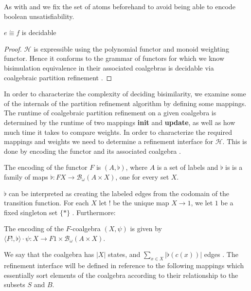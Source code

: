 \documentclass[a4paper,UKenglish,cleveref, autoref, thm-restate]{lipics-v2021}
\newcommand{\gkat}{\textsf{\upshape{GKAT}}\xspace}
\newcommand{\probgkat}{\textsf{\upshape{ProbGKAT}}\xspace}
\theoremstyle{plain}\newtheoremrep{thm}{Theorem}[section]
\begin{document}
	\begin{toappendix} 
		\label{DecideAppendix}
		As with \gkat and \probgkat we fix the set of atoms beforehand to avoid being able to encode boolean unsatisfiability.
	\begin{thm}[Decidability]
		$e\dot\equiv f$ is decidable
	\end{thm}
	\begin{proof}
		$\mathcal H$ is expressible using the polynomial functor and monoid weighting functor. Hence it conforms to the grammar of functors for which we know bisimulation equivalence in their associated coalgebras is decidable via coalgebraic partition refinement \cite{10.1007/978-3-030-30942-8_18}. 
	\end{proof}

		In order to characterize the complexity of deciding bisimilarity, we examine some of the internals of the partition refinement algorithm by defining some mappings. The runtime of coalgebraic partition refinement on a given coalgebra is determined by the runtime of two mappings \textbf{init} and \textbf{update}, as well as how much time it takes to compare weights. In order to characterize the required mappings and weights we need to determine a refinement interface for $\mathcal{H}$. This is done by encoding the functor and its associated coalgebra \cite[Section 8]{wissmann2020efficient}. 
		
		\begin{defn}[\cite{10.1007/978-3-030-30942-8_18}]The encoding of the functor $F$ is $(A, \flat)$, where $A$ is a set of labels and $\flat$ is is a family of maps $\flat:FX \to \mathcal{B}_\omega (A \times X)$, one for every set $X$.
		\end{defn}
		$\flat$ can be interpreted as creating the labeled edges from the codomain of the transition function. 
		For each $X$ let $!$ be the unique map $X\to 1$, we let $1$ be a fixed singleton set $\{*\}$ \cite{10.1007/978-3-030-30942-8_18}. Furthermore:
		
		\begin{defn}[\cite{10.1007/978-3-030-30942-8_18}]The encoding of the $F$-coalgebra $(X, \psi)$ is given by $\langle F!,\flat\rangle\cdot \psi: X \to F1 \times \mathcal B_\omega(A \times X)$.
		\end{defn}
		
		We say that the coalgebra has $|X|$ states, and $\sum_{x\in X} |\flat(c(x))|$ edges \cite{10.1007/978-3-030-30942-8_18}. The refinement interface will be defined in reference to the following mappings which essentially sort elements of the coalgebra according to their relationship to the subsets $S$ and $B$. 
		

\end{toappendix}
\end{document}
